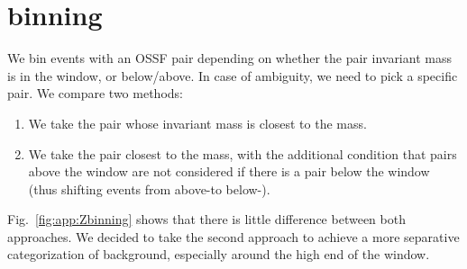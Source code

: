 \chapter{\texorpdfstring{\boldmath{\Z}}{Z} binning}
\label{app:Zbinning}

We bin events with an OSSF pair depending on whether the pair invariant mass is in the \Z window, or below/above. In case of ambiguity, we need to pick a specific pair. We compare two methods:
\begin{enumerate}
	\item We take the pair whose invariant mass is closest to the \Z mass.
	\item We take the pair closest to the \Z mass, with the additional condition that pairs above the \Z window are not considered if there is a pair below the \Z window (thus shifting events from above-\Z to below-\Z).
\end{enumerate}

Fig.~\ref{fig:app:Zbinning} shows that there is little difference between both approaches. We decided to take the second approach to achieve a more separative categorization of background, especially around the high end of the \Z window.

